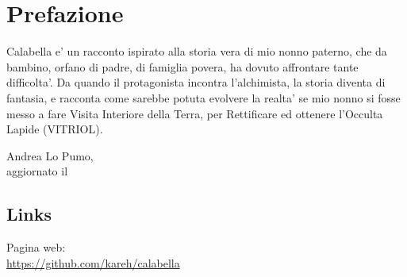 \chapter{Prefazione}

Calabella e' un racconto ispirato alla storia vera di mio nonno paterno, che da bambino, orfano di padre, di famiglia povera, ha dovuto affrontare tante difficolta'. Da quando il protagonista incontra l'alchimista, la storia diventa di fantasia, e racconta come sarebbe potuta evolvere la realta' se mio nonno si fosse messo a fare Visita Interiore della Terra, per Rettificare ed ottenere l'Occulta Lapide (VITRIOL).

\begin{flushright}
    \vspace*{\fill}
    Andrea Lo Pumo, \finishDate\\
    aggiornato il \lastUpdateDate
\end{flushright}

\section{Links}

Pagina web:\\
\url{https://github.com/kareh/calabella}


